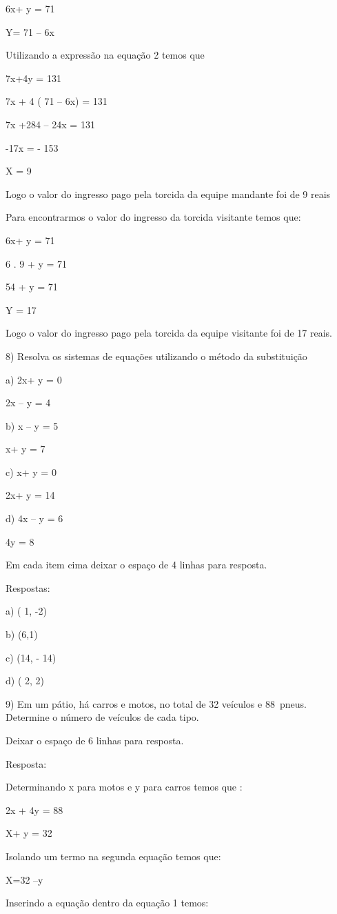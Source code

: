 6x+ y = 71

Y= 71 -- 6x

Utilizando a expressão na equação 2 temos que

7x+4y = 131

7x + 4 ( 71 -- 6x) = 131

7x +284 -- 24x = 131

-17x = - 153

X = 9

Logo o valor do ingresso pago pela torcida da equipe mandante foi de 9
reais

Para encontrarmos o valor do ingresso da torcida visitante temos que:

6x+ y = 71

6 . 9 + y = 71

54 + y = 71

Y = 17

Logo o valor do ingresso pago pela torcida da equipe visitante foi de 17
reais.

8) Resolva os sistemas de equações utilizando o método da substituição

a) 2x+ y = 0

2x -- y = 4

b) x -- y = 5

x+ y = 7

c) x+ y = 0

2x+ y = 14

d) 4x -- y = 6

4y = 8

Em cada item cima deixar o espaço de 4 linhas para resposta.

Respostas:

a) ( 1, -2)

b) (6,1)

c) (14, - 14)

d) ( 2, 2)

9) Em um pátio, há carros e motos, no total de 32 veículos e 88~pneus.
Determine o número de veículos de cada tipo.

Deixar o espaço de 6 linhas para resposta.

Resposta:

Determinando x para motos e y para carros temos que :

2x + 4y = 88

X+ y = 32

Isolando um termo na segunda equação temos que:

X=32 --y

Inserindo a equação dentro da equação 1 temos:

